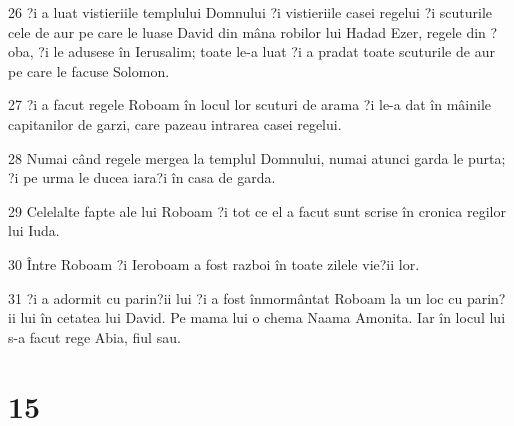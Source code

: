 \par 26 ?i a luat vistieriile templului Domnului ?i vistieriile casei regelui ?i scuturile cele de aur pe care le luase David din mâna robilor lui Hadad Ezer, regele din ?oba, ?i le adusese în Ierusalim; toate le-a luat ?i a pradat toate scuturile de aur pe care le facuse Solomon.
\par 27 ?i a facut regele Roboam în locul lor scuturi de arama ?i le-a dat în mâinile capitanilor de garzi, care pazeau intrarea casei regelui.
\par 28 Numai când regele mergea la templul Domnului, numai atunci garda le purta; ?i pe urma le ducea iara?i în casa de garda.
\par 29 Celelalte fapte ale lui Roboam ?i tot ce el a facut sunt scrise în cronica regilor lui Iuda.
\par 30 Între Roboam ?i Ieroboam a fost razboi în toate zilele vie?ii lor.
\par 31 ?i a adormit cu parin?ii lui ?i a fost înmormântat Roboam la un loc cu parin?ii lui în cetatea lui David. Pe mama lui o chema Naama Amonita. Iar în locul lui s-a facut rege Abia, fiul sau.

\chapter{15}

